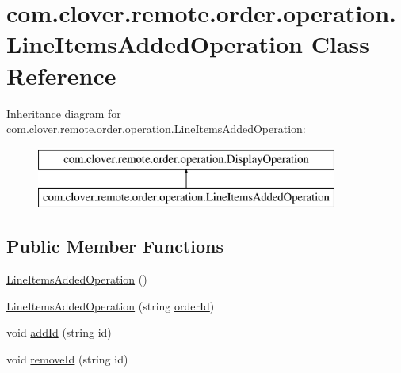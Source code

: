 \hypertarget{classcom_1_1clover_1_1remote_1_1order_1_1operation_1_1_line_items_added_operation}{}\section{com.\+clover.\+remote.\+order.\+operation.\+Line\+Items\+Added\+Operation Class Reference}
\label{classcom_1_1clover_1_1remote_1_1order_1_1operation_1_1_line_items_added_operation}
Inheritance diagram for com.\+clover.\+remote.\+order.\+operation.\+Line\+Items\+Added\+Operation\+:\begin{figure}[H]
\begin{center}
\leavevmode
\includegraphics[height=2.000000cm]{classcom_1_1clover_1_1remote_1_1order_1_1operation_1_1_line_items_added_operation}
\end{center}
\end{figure}
\subsection*{Public Member Functions}
\begin{DoxyCompactItemize}
\item 
\hyperlink{classcom_1_1clover_1_1remote_1_1order_1_1operation_1_1_line_items_added_operation_a9c5c992ab4220b18f4a0beda23cf43b4}{Line\+Items\+Added\+Operation} ()
\item 
\hyperlink{classcom_1_1clover_1_1remote_1_1order_1_1operation_1_1_line_items_added_operation_ab109a9949d9ba4460769a032cfe61240}{Line\+Items\+Added\+Operation} (string \hyperlink{classcom_1_1clover_1_1remote_1_1order_1_1operation_1_1_line_items_added_operation_a3d210c422f722cef34c52d606a01d6f0}{order\+Id})
\item 
void \hyperlink{classcom_1_1clover_1_1remote_1_1order_1_1operation_1_1_line_items_added_operation_a9e1a1b5bd68d21d4487e500d388dd231}{add\+Id} (string id)
\item 
void \hyperlink{classcom_1_1clover_1_1remote_1_1order_1_1operation_1_1_line_items_added_operation_a22370803700751191608d75f904d400e}{remove\+Id} (string id)
\end{DoxyCompactItemize}
